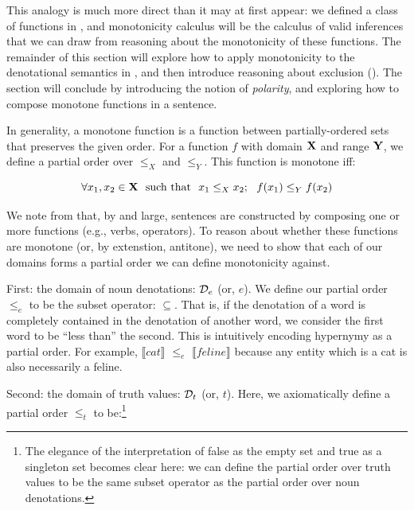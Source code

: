 This analogy is much more direct than it may at first appear:
  we defined a class of functions in 
  ,
  and monotonicity calculus will be the calculus of valid inferences that
  we can draw from reasoning about the monotonicity of these functions.
The remainder of this section will explore how to apply monotonicity to
  the denotational semantics in ,
  and then introduce reasoning about exclusion ().
The section will conclude by introducing the notion of \textit{polarity},
  and exploring how to compose monotone functions in a sentence.



%
%

In generality, a monotone function is a function between partially-ordered sets
  that preserves the given order.
For a function $f$ with domain $\mathbf{X}$ and range $\mathbf{Y}$, we define a partial order over
  $\leq_X$ and $\leq_Y$.
This function is monotone iff:

\begin{equation}
  \forall x_1, x_2 \in \mathbf{X} ~~ \textrm{such that} ~~ x_1 \leq_X x_2; ~~  f(x_1) \leq_Y f(x_2)
\end{equation}

We note from  that, by and large, sentences 
  are constructed by composing one or more functions (e.g., verbs, operators).
To reason about whether these functions are monotone (or, by extenstion, antitone),
  we need to show that each of our domains forms a partial order we can define
  monotonicity against.

First: the domain of noun denotations: $\mathcal{D}_e$ (or, $e$).
We define our partial order $\leq_e$ to be the subset operator: $\subseteq$.
That is, if the denotation of a word is completely contained in the denotation of
  another word, we consider the first word to be ``less than'' the second.
This is intuitively encoding hypernymy as a partial order.
For example, $\llbracket cat \rrbracket$ $\leq_e$ $\llbracket feline \rrbracket$ because
  any entity which is a cat is also necessarily a feline.

Second: the domain of truth values: $\mathcal{D}_t$ (or, $t$).
Here, we axiomatically define a partial order $\leq_t$ to be:\footnote{
    The elegance of the interpretation of false as the empty set and true as a singleton
    set becomes clear here: we can define the partial order over truth values to be the same
    subset operator as the partial order over noun denotations.
    }

